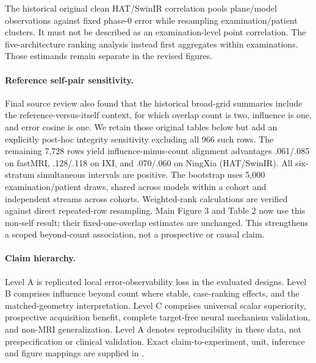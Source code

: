 The historical original clean HAT/SwinIR correlation pools plane/model observations against fixed phase-0 error while resampling examination/patient clusters. It must not be described as an examination-level point correlation. The five-architecture ranking analysis instead first aggregates within examinations. Those estimands remain separate in the revised figures.

\paragraph{Reference self-pair sensitivity.}
Final source review also found that the historical broad-grid summaries include the reference-versus-itself context, for which overlap count is two, influence is one, and error cosine is one. We retain those original tables below but add an explicitly post-hoc integrity sensitivity excluding all 966 such rows. The remaining 7,728 rows yield influence-minus-count alignment advantages .061/.085 on fastMRI, .128/.118 on IXI, and .070/.060 on NingXia (HAT/SwinIR). All six-stratum simultaneous intervals are positive. The bootstrap uses 5,000 examination/patient draws, shared across models within a cohort and independent streams across cohorts. Weighted-rank calculations are verified against direct repeated-row resampling. Main Figure 3 and Table 2 now use this non-self result; their fixed-one-overlap estimates are unchanged. This strengthens a scoped beyond-count association, not a prospective or causal claim.

\paragraph{Claim hierarchy.}
Level A is replicated local error-observability loss in the evaluated designs. Level B comprises influence beyond count where stable, case-ranking effects, and the matched-geometry interpretation. Level C comprises universal scalar superiority, prospective acquisition benefit, complete target-free neural mechanism validation, and non-MRI generalization. Level A denotes reproducibility in these data, not prespecification or clinical validation. Exact claim-to-experiment, unit, inference and figure mappings are supplied in .

